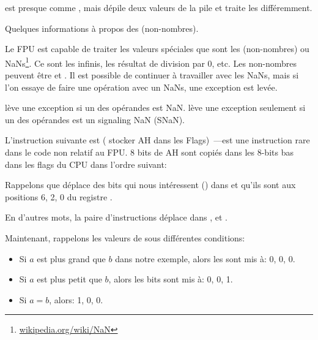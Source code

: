 



\FUCOMPP{} est presque comme \FCOM, mais dépile deux valeurs de la pile et traite
les  différemment.

Quelques informations à propos des  (non-nombres).

\newcommand{\NANFN}{\footnote{\href{http://go.yurichev.com/17130}{wikipedia.org/wiki/NaN}}}

Le FPU est capable de traiter les valeurs spéciales que sont les 
(non-nombres) ou \gls{NaN}s\NANFN.
Ce sont les infinis, les résultat de division par 0, etc.
Les non-nombres peuvent être  et . Il est possible de continuer
à travailler avec les  NaNs, mais si l'on essaye de faire une opération avec
un  NaNs, une exception est levée.


\FCOM lève une exception si un des opérandes est \gls{NaN}.
\FUCOM lève une exception seulement si un des opérandes est un signaling \gls{NaN}
(SNaN).

\label{SAHF}

L'instruction suivante est \SAHF ( stocker AH dans les Flags)~---est
une instruction rare dans le code non relatif au FPU.
8 bits de AH sont copiés dans les 8-bits bas dans les flags du CPU dans l'ordre suivant:




Rappelons que \FNSTSW déplace des bits qui nous intéressent (\CThreeBits) dans \AH
et qu'ils sont aux positions 6, 2, 0 du registre \AH.



En d'autres mots, la paire d'instructions  déplace \CThreeBits
dans \ZF, \PF et \CF.

Maintenant, rappelons les valeurs de \CThreeBits sous différentes conditions:

\begin{itemize}
\item Si $a$ est plus grand que $b$ dans notre exemple, alors les \CThreeBits sont
mis à: 0, 0, 0.
\item Si $a$ est plus petit que $b$, alors les bits sont mis à: 0, 0, 1.
\item Si $a=b$, alors: 1, 0, 0.
\end{itemize}

